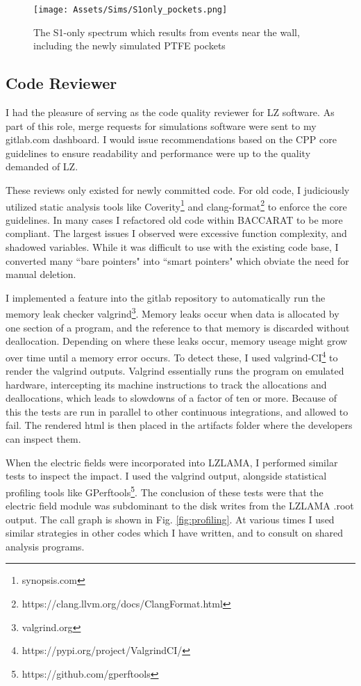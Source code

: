 \begin{figure}
    \centering
    \texttt{[image: Assets/Sims/S1only\_pockets.png]}
    \caption{The S1-only spectrum which results from events near the wall, including the newly simulated PTFE pockets}
    \label{fig:ptfe_s1only}
\end{figure}
\subsection{Code Reviewer}
I had the pleasure of serving as the code quality reviewer for LZ software.
As part of this role, merge requests for simulations software were sent to my gitlab.com dashboard.
I would issue recommendations based on the CPP core guidelines to ensure readability and performance were up to the quality demanded of LZ.

These reviews only existed for newly committed code.
For old code, I judiciously utilized static analysis tools  like Coverity\footnote{synopsis.com} and clang-format\footnote{https://clang.llvm.org/docs/ClangFormat.html} to enforce the core guidelines.
In many cases I refactored old code within BACCARAT to be more compliant.
The largest issues I observed were excessive function complexity, and shadowed variables.
While it was difficult to use with the existing code base, I converted many ``bare pointers" into ``smart pointers" which obviate the need for manual deletion.

I implemented a feature into the gitlab repository to automatically run the memory leak checker valgrind\footnote{valgrind.org}.
Memory leaks occur when data is allocated by one section of a program, and the reference to that memory is discarded without deallocation.
Depending on where these leaks occur, memory useage might grow over time until a memory error occurs.
To detect these, I used valgrind-CI\footnote{https://pypi.org/project/ValgrindCI/} to render the valgrind outputs.
Valgrind essentially runs the program on emulated hardware, intercepting its machine instructions to track the allocations and deallocations, which leads to slowdowns of a factor of ten or more.
Because of this the tests are run in parallel to other continuous integrations, and allowed to fail.
The rendered html is then placed in the artifacts folder where the developers can inspect them.

When the electric fields were incorporated into LZLAMA, I performed similar tests to inspect the impact. 
I used the valgrind output, alongside statistical profiling tools like GPerftools\footnote{https://github.com/gperftools}.
The conclusion of these tests were that the electric field module was subdominant to the disk writes from the LZLAMA .root output.
The call graph is shown in Fig. \ref{fig:profiling}.
At various times I used similar strategies in other codes which I have written, and to consult on shared analysis programs.



